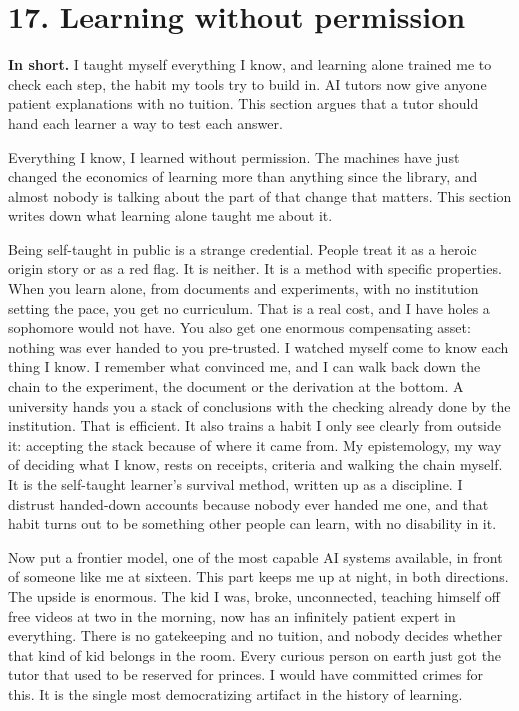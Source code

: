 \documentclass[11pt]{article}
\begin{document}
\section*{17. Learning without permission}

\textbf{In short.} I taught myself everything I know, and learning alone trained me to check each step, the habit my tools try to build in. AI tutors now give anyone patient explanations with no tuition. This section argues that a tutor should hand each learner a way to test each answer.

Everything I know, I learned without permission. The machines have just changed the economics of learning more than anything since the library, and almost nobody is talking about the part of that change that matters. This section writes down what learning alone taught me about it.

Being self-taught in public is a strange credential. People treat it as a heroic origin story or as a red flag. It is neither. It is a method with specific properties. When you learn alone, from documents and experiments, with no institution setting the pace, you get no curriculum. That is a real cost, and I have holes a sophomore would not have. You also get one enormous compensating asset: nothing was ever handed to you pre-trusted. I watched myself come to know each thing I know. I remember what convinced me, and I can walk back down the chain to the experiment, the document or the derivation at the bottom. A university hands you a stack of conclusions with the checking already done by the institution. That is efficient. It also trains a habit I only see clearly from outside it: accepting the stack because of where it came from. My epistemology, my way of deciding what I know, rests on receipts, criteria and walking the chain myself. It is the self-taught learner's survival method, written up as a discipline. I distrust handed-down accounts because nobody ever handed me one, and that habit turns out to be something other people can learn, with no disability in it.

Now put a frontier model, one of the most capable AI systems available, in front of someone like me at sixteen. This part keeps me up at night, in both directions. The upside is enormous. The kid I was, broke, unconnected, teaching himself off free videos at two in the morning, now has an infinitely patient expert in everything. There is no gatekeeping and no tuition, and nobody decides whether that kind of kid belongs in the room. Every curious person on earth just got the tutor that used to be reserved for princes. I would have committed crimes for this. It is the single most democratizing artifact in the history of learning.
\end{document}
